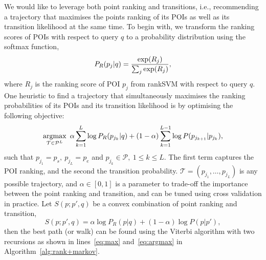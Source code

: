 We would like to leverage both point ranking and transitions,
i.e., recommending a trajectory that maximises the points ranking of its POIs as well as its transition likelihood at the same time.
To begin with, we transform the ranking scores of POIs with respect to query $q$
to a probability distribution using the softmax function,
\eqmoveup
\begin{equation}
\eqmoveup
\label{eq:rankprob}
P_R(p_j | q) = \frac{\exp(R_j)}{\sum_j \exp(R_j)},
\end{equation}
where $R_j$ is the ranking score of POI $p_j$ from rankSVM with respect to query $q$.
One heuristic to find a trajectory that simultaneously maximises the ranking probabilities of its POIs and its transition likelihood
is by optimising the following objective:
\eqmoveup
\begin{equation*}\eqmoveup
    \argmax_{\mathcal{T} \in \mathcal{P}^L} ~\alpha \sum_{k=1}^{L} \log P_R(p_{j_k} | q) +
                                     (1-\alpha) \sum_{k=1}^{L-1} \log P(p_{j_{k+1}} | p_{j_k}),
\end{equation*}
such that
$p_{j_1} = p_s, ~ p_{j_L} = p_e$ and
$p_{j_k} \in \mathcal{P}, ~1 \le k \le L$.
The first term captures the POI ranking, and the second the transition probability.
$\mathcal{T} = (p_{j_1}, \dots, p_{j_L})$ is any possible trajectory,
and $\alpha \in [0, 1]$ is a parameter to trade-off the importance between the point ranking and transition,
and can be tuned using cross validation in practice.
Let $S(p; p', q)$ be a convex combination of point ranking and transition,
\eqmoveup
\begin{equation}\label{eq:combined-score}
    S(p; p', q)  = \alpha \log P_R(p|q) + (1-\alpha) \log P(p|p'),
\end{equation}
then the best path (or walk) can be found using the Viterbi algorithm with two recursions
as shown in lines~\ref{eq:max} and~\ref{eq:argmax} in Algorithm~\ref{alg:rank+markov}.
